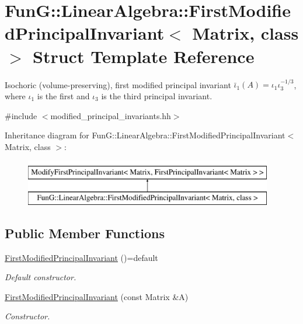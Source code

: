 \hypertarget{structFunG_1_1LinearAlgebra_1_1FirstModifiedPrincipalInvariant}{\section{Fun\-G\-:\-:Linear\-Algebra\-:\-:First\-Modified\-Principal\-Invariant$<$ Matrix, class $>$ Struct Template Reference}
\label{structFunG_1_1LinearAlgebra_1_1FirstModifiedPrincipalInvariant}
}


Isochoric (volume-\/preserving), first modified principal invariant $ \bar\iota_1(A)=\iota_1\iota_3^{-1/3} $, where $\iota_1$ is the first and $\iota_3$ is the third principal invariant.  




{\ttfamily \#include $<$modified\-\_\-principal\-\_\-invariants.\-hh$>$}

Inheritance diagram for Fun\-G\-:\-:Linear\-Algebra\-:\-:First\-Modified\-Principal\-Invariant$<$ Matrix, class $>$\-:\begin{figure}[H]
\begin{center}
\leavevmode
\includegraphics[height=2.000000cm]{structFunG_1_1LinearAlgebra_1_1FirstModifiedPrincipalInvariant}
\end{center}
\end{figure}
\subsection*{Public Member Functions}
\begin{DoxyCompactItemize}
\item 
\hypertarget{structFunG_1_1LinearAlgebra_1_1FirstModifiedPrincipalInvariant_ae7b7c7451b9c6e80f3c201539e171e7d}{\hyperlink{structFunG_1_1LinearAlgebra_1_1FirstModifiedPrincipalInvariant_ae7b7c7451b9c6e80f3c201539e171e7d}{First\-Modified\-Principal\-Invariant} ()=default}\label{structFunG_1_1LinearAlgebra_1_1FirstModifiedPrincipalInvariant_ae7b7c7451b9c6e80f3c201539e171e7d}

\begin{DoxyCompactList}\small\item\em Default constructor. \end{DoxyCompactList}\item 
\hyperlink{structFunG_1_1LinearAlgebra_1_1FirstModifiedPrincipalInvariant_aafdbc11f6d6022e7f6dd9d693d6f1d8e}{First\-Modified\-Principal\-Invariant} (const Matrix \&A)
\begin{DoxyCompactList}\small\item\em Constructor. \end{DoxyCompactList}\end{DoxyCompactItemize}



